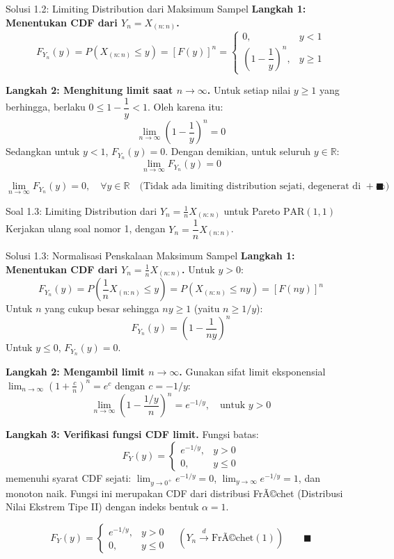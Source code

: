 \documentclass[10pt,twoside]{article}
\begin{document}
\begin{solbox}{Solusi 1.2: Limiting Distribution dari Maksimum Sampel}
\textbf{Langkah 1: Menentukan CDF dari $Y_n = X_{(n:n)}$.}
\[
F_{Y_n}(y) = P(X_{(n:n)} \le y) = [F(y)]^n = \begin{cases} 0, & y < 1 \\ \left(1 - \dfrac{1}{y}\right)^n, & y \ge 1 \end{cases}
\]

\textbf{Langkah 2: Menghitung limit saat $n \to \infty$.}
Untuk setiap nilai $y \ge 1$ yang berhingga, berlaku $0 \le 1 - \dfrac{1}{y} < 1$. Oleh karena itu:
\[
\lim_{n \to \infty} \left(1 - \frac{1}{y}\right)^n = 0
\]
Sedangkan untuk $y < 1$, $F_{Y_n}(y) = 0$.
Dengan demikian, untuk seluruh $y \in \mathbb{R}$:
\[
\lim_{n \to \infty} F_{Y_n}(y) = 0
\]

\[
\boxed{\lim_{n \to \infty} F_{Y_n}(y) = 0, \quad \forall y \in \mathbb{R} \quad \text{(Tidak ada limiting distribution sejati, degenerat di }+\infty\text{)}} \qquad \blacksquare
\]
\end{solbox}

\begin{soalbox}{Soal 1.3: Limiting Distribution dari $Y_n = \frac{1}{n}X_{(n:n)}$ untuk Pareto $\text{PAR}(1,1)$}
Kerjakan ulang soal nomor 1, dengan $Y_n = \dfrac{1}{n}X_{(n:n)}$.
\end{soalbox}

\begin{solbox}{Solusi 1.3: Normalisasi Penskalaan Maksimum Sampel}
\textbf{Langkah 1: Menentukan CDF dari $Y_n = \frac{1}{n}X_{(n:n)}$.}
Untuk $y > 0$:
\[
F_{Y_n}(y) = P\left(\frac{1}{n}X_{(n:n)} \le y\right) = P(X_{(n:n)} \le ny) = [F(ny)]^n
\]
Untuk $n$ yang cukup besar sehingga $ny \ge 1$ (yaitu $n \ge 1/y$):
\[
F_{Y_n}(y) = \left(1 - \frac{1}{ny}\right)^n
\]
Untuk $y \le 0$, $F_{Y_n}(y) = 0$.

\textbf{Langkah 2: Mengambil limit $n \to \infty$.}
Gunakan sifat limit eksponensial $\lim_{n \to \infty} \left(1 + \frac{c}{n}\right)^n = e^c$ dengan $c = -1/y$:
\[
\lim_{n \to \infty} \left(1 - \frac{1/y}{n}\right)^n = e^{-1/y}, \quad \text{untuk } y > 0
\]

\textbf{Langkah 3: Verifikasi fungsi CDF limit.}
Fungsi batas:
\[
F_Y(y) = \begin{cases} e^{-1/y}, & y > 0 \\ 0, & y \le 0 \end{cases}
\]
memenuhi syarat CDF sejati: $\lim_{y \to 0^+} e^{-1/y} = 0$, $\lim_{y \to \infty} e^{-1/y} = 1$, dan monoton naik.
Fungsi ini merupakan CDF dari distribusi FrÃ©chet (Distribusi Nilai Ekstrem Tipe II) dengan indeks bentuk $\alpha = 1$.

\[
\boxed{F_Y(y) = \begin{cases} e^{-1/y}, & y > 0 \\ 0, & y \le 0 \end{cases} \quad \left(Y_n \xrightarrow{d} \text{FrÃ©chet}(1)\right)} \qquad \blacksquare
\]
\end{solbox}
\end{document}
